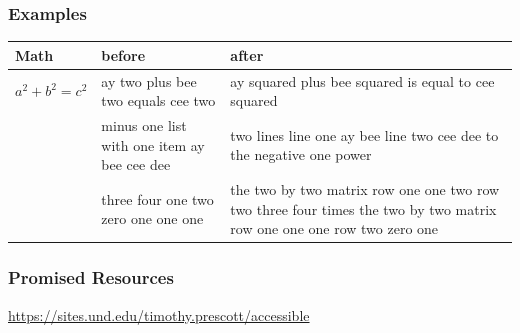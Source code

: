 \documentclass{ltx-talk}
\begin{document}
\begin{frame}
\frametitle{Examples}
\begin{tabular}{l p{} p{}}
Math & before & after \\\midrule
$a^2+b^2=c^2$ & ay two plus bee two equals cee two & ay squared plus bee squared is equal to cee squared\\\addlinespace[4ex]
{$\begin{pmatrix}a&b\\c&d\end{pmatrix}^{-1}$} & minus one list with one item ay bee cee dee & two lines line one ay bee line two cee dee to the negative one power \\\addlinespace[4ex]
{$\begin{pmatrix}1&2\\3&4\end{pmatrix}\begin{pmatrix}1&1\\0&1\end{pmatrix}$} & three four one two zero one one one & the two by two matrix row one one two row two three four times the two by two matrix row one one one row two zero one
\end{tabular}
\end{frame}

\begin{frame}
\frametitle{Promised Resources}\centering
\vfill
\url{https://sites.und.edu/timothy.prescott/accessible}\\\vfill
{}\vfill
\end{frame}
\end{document}
